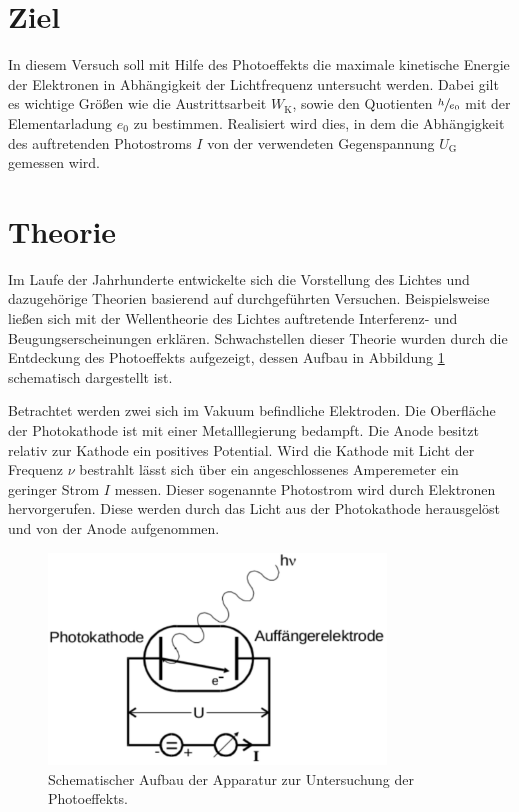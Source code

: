 \section*{Ziel}

In diesem Versuch soll mit Hilfe des Photoeffekts die maximale kinetische Energie der Elektronen in Abhängigkeit der Lichtfrequenz untersucht werden.
Dabei gilt es wichtige Größen wie die Austrittsarbeit $W_\mathup{K}$, sowie den Quotienten $\sfrac{h}{e_0}$ mit der Elementarladung $e_0$ zu bestimmen. 
Realisiert wird dies, in dem die Abhängigkeit des auftretenden Photostroms $I$ von der verwendeten Gegenspannung $U_\mathup{G}$ gemessen wird.

\section{Theorie}
\label{sec:Theorie}

Im Laufe der Jahrhunderte entwickelte sich die Vorstellung des Lichtes und dazugehörige Theorien basierend auf durchgeführten Versuchen.
Beispielsweise ließen sich mit der Wellentheorie des Lichtes auftretende Interferenz- und Beugungserscheinungen erklären. 
Schwachstellen dieser Theorie wurden durch die Entdeckung des Photoeffekts aufgezeigt, dessen Aufbau in Abbildung \ref{fig:schematischer Aufbau}  schematisch dargestellt ist.

Betrachtet werden zwei sich im Vakuum befindliche Elektroden. 
Die Oberfläche der Photokathode ist mit einer Metalllegierung bedampft. 
Die Anode besitzt relativ zur Kathode ein positives Potential.
 Wird die Kathode mit Licht der Frequenz $\nu$ bestrahlt lässt sich über ein angeschlossenes Amperemeter ein geringer Strom $I$ messen. Dieser sogenannte Photostrom wird durch Elektronen hervorgerufen.
 Diese werden durch das Licht aus der Photokathode herausgelöst und von der Anode aufgenommen. 
 
\begin{figure}
	\centering
	\includegraphics[width=0.8\textwidth]{Bilder/schematischer_Aufbau.pdf}
	\caption{Schematischer Aufbau der Apparatur zur Untersuchung der Photoeffekts.}
	\label{fig:schematischer Aufbau}
\end{figure}


